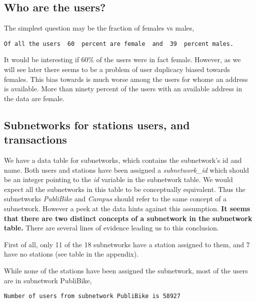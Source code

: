 \documentclass{report}
\begin{document}
    



    \subsection{Who are the users?}\label{who-are-the-users}

The simplest question may be the fraction of females vs males,


    \begin{Verbatim}[commandchars=\\\{\}]
Of all the users  60  percent are female  and  39  percent males.
    \end{Verbatim}

    It would be interesting if 60\% of the users were in fact female.
However, as we will see later there seems to be a problem of user
duplicacy biased towards females. This bias towards is much worse among
the users for whome an address is available. More than ninety percent of
the users with an available address in the data are female.

    \subsection{Subnetworks for stations users, and
transactions}\label{subnetworks-for-stations-users-and-transactions}

We have a data table for subnetworks, which contains the subnetwork's id
and name. Both users and stations have been assigned a
\emph{subnetwork\_id} which should be an integer pointing to the
\emph{id} variable in the subnetwork table. We would expect all the
subnetworks in this table to be conceptually equivalent. Thus the
subnetworks \emph{PubliBike} and \emph{Campus} should refer to the same
concept of a subnetwork. However a peek at the data hints against this
assumption. \textbf{It seems that there are two distinct concepts of a
subnetwork in the subnetwork table.} There are several lines of evidence
leading us to this conclusion.

First of all, only 11 of the 18 subnetworks have a station assigned to
them, and 7 have no stations (see table in the appendix).



    While none of the stations have been assigned the subnetwork, most of
the users are in subnetwork PubliBike,


    \begin{Verbatim}[commandchars=\\\{\}]
Number of users from subnetwork PubliBike is 58927
    \end{Verbatim}
\end{document}
